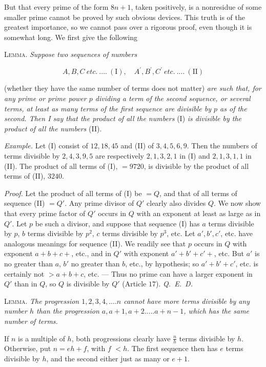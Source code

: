 But that every prime of the form $8n+1$, taken positively, is a nonresidue of some smaller prime cannot be proved by such obvious devices. This truth is of the greatest importance, so we cannot pass over a rigorous proof, even though it is somewhat long. We first give the following

\textsc{Lemma.} \textit{Suppose two sequences of numbers}

\[
A,B,C\ \textit{etc.}\ ....\ (\mathrm{I}),\quad A^{\prime},B^{\prime},C^{\prime}\ \textit{etc.}\ ....\ (\mathrm{II})
\]

(whether they have the same number of terms does not matter) \textit{are such that, for any prime or prime power $p$ dividing a term of the second sequence, or several terms, at least as many terms of the first sequence are divisible by $p$ as of the second. Then I say that the product of all the numbers} (I) \textit{is divisible by the product of all the numbers} (II).

\textit{Example.} Let (I) consist of $12,18,45$ and (II) of $3,4,5,6,9$. Then the numbers of terms divisible by $2,4,3,9,5$ are respectively $2,1,3,2,1$ in (I) and $2,1,3,1,1$ in (II). The product of all terms of (I), $=9720$, is divisible by the product of all terms of (II), $3240$.

\textit{Proof.} Let the product of all terms of (I) be $=Q$, and that of all terms of sequence (II) $=Q'$. Any prime divisor of $Q'$ clearly also divides $Q$. We now show that every prime factor of $Q'$ occurs in $Q$ with an exponent at least as large as in $Q'$. Let $p$ be such a divisor, and suppose that sequence (I) has $a$ terms divisible by $p$, $b$ terms divisible by $p^2$, $c$ terms divisible by $p^3$, etc. Let $a',b',c'$, etc. have analogous meanings for sequence (II). We readily see that $p$ occurs in $Q$ with exponent $a+b+c+$, etc., and in $Q'$ with exponent $a'+b'+c'+$, etc. But $a'$ is no greater than $a$, $b'$ no greater than $b$, etc., by hypothesis; so $a'+b'+c'$, etc. is certainly not $>a+b+c$, etc. --- Thus no prime can have a larger exponent in $Q'$ than in $Q$, so $Q$ is divisible by $Q'$ (Article $17$). \mbox{\textit{Q. E. D.}}

\textsc{Lemma.} \textit{The progression $1,2,3,4,....n$ cannot have more terms divisible by any number $h$ than the progression $a,a+1,a+2.....a+n-1$, which has the same number of terms.}

If $n$ is a multiple of $h$, both progressions clearly have $\frac nh$ terms divisible by $h$. Otherwise, put $n=eh+f$, with $f$ $<h$. The first sequence then has $e$ terms divisible by $h$, and the second either just as many or $e+1$.

